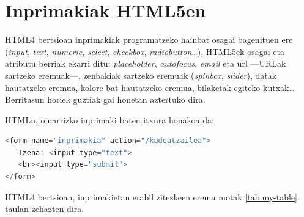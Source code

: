 \chapter{Inprimakiak HTML5en}
HTML4 bertsioan inprimakiak programatzeko hainbat osagai bagenituen ere (\textit{input}, \textit{text}, \textit{numeric}, \textit{select}, \textit{checkbox}, \textit{radiobutton}…), HTML5ek osagai eta atributu berriak ekarri ditu: \textit{placeholder}, \textit{autofocus}, \textit{email} eta  url —URLak sartzeko eremuak—, zenbakiak sartzeko eremuak (\textit{spinbox}, \textit{slider}), datak hautatzeko eremua, kolore bat hautatzeko eremua, bilaketak egiteko kutxak… Berritasun horiek guztiak gai honetan aztertuko dira.

HTMLn, oinarrizko inprimaki baten itxura honakoa da:

\begin{lstlisting}[language=JavaScript]
<form name="inprimakia" action="/kudeatzailea">
   Izena: <input type="text">
   <br><input type="submit">
</form>
\end{lstlisting}


HTML4 bertsioan, inprimakietan erabil zitezkeen eremu motak \ref{tab:my-table}.  taulan zehazten dira.

